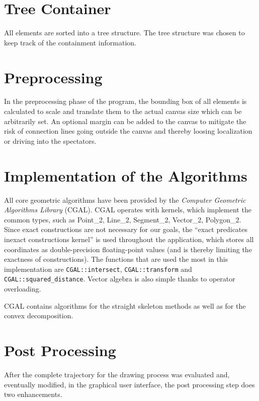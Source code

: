 \section{Tree Container}

All elements are sorted into a tree structure. The tree structure was chosen to keep track of the containment information.

\section{Preprocessing}

In the preprocessing phase of the program, the bounding box of all elements is calculated to scale and translate them to the actual canvas size which can be arbitrarily set. An optional margin can be added to the canvas to mitigate the risk of connection lines going outside the canvas and thereby loosing localization or driving into the spectators.

\section{Implementation of the Algorithms}

All core geometric algorithms have been provided by the \textit{Computer Geometric Algorithms Library} (CGAL)\cite{cgal:eb-00a}. CGAL operates with kernels, which implement the common types, such as Point\_2, Line\_2, Segment\_2, Vector\_2, Polygon\_2. Since exact constructions are not necessary for our goals, the 
\enquote{exact predicates inexact constructions kernel} is used throughout the application, which stores all coordinates as double-precision floating-point values (and is thereby limiting the exactness of constructions). The functions that are used the most in this implementation are \texttt{CGAL::intersect}, \texttt{CGAL::transform} and \texttt{CGAL::squared\_distance}. Vector algebra is also simple thanks to operator overloading.

CGAL contains algorithms for the straight skeleton methods\cite{cgal:c-sspo2-14a} as well as for the convex decomposition\cite{cgal:h-pp2-00a}.

\section{Post Processing}

After the complete trajectory for the drawing process was evaluated and, eventually modified, in the graphical user interface, the post processing step does two enhancements.

